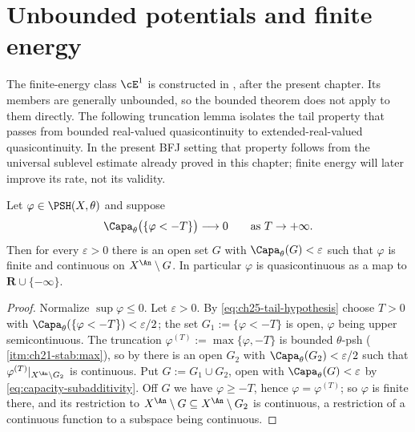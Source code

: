\section{Unbounded potentials and finite energy}
\label{sec:ch25-e1}

The finite-energy class $\cE^1$ is constructed in
, after the present chapter.  Its members are
generally unbounded, so the bounded theorem does not apply to them directly.
The following truncation lemma isolates the tail property that passes from
bounded real-valued quasicontinuity to extended-real-valued
quasicontinuity.  In the present BFJ setting that property follows from the
universal sublevel estimate already proved in this chapter; finite energy
will later improve its rate, not its validity.

\begin{lemma}
\label{lem:ch25-quasicontinuity-from-tail}
Let $\varphi\in\PSH(X,\theta)$ and suppose
\begin{equation}
\label{eq:ch25-tail-hypothesis}
 \Capa_\theta\bigl(\{\varphi<-T\}\bigr)\longrightarrow0
 \qquad\text{as }T\to+\infty .
\end{equation}
Then for every $\varepsilon>0$ there is an open set $G$ with
$\Capa_\theta(G)<\varepsilon$ such that $\varphi$ is finite and
continuous on $X^{\An}\setminus G$.  In particular $\varphi$ is
quasicontinuous as a map to $\mathbf R\cup\{-\infty\}$.
\end{lemma}

\begin{proof}
Normalize $\sup\varphi\leq0$.  Let $\varepsilon>0$.  By
\eqref{eq:ch25-tail-hypothesis} choose $T>0$ with
$\Capa_\theta(\{\varphi<-T\})<\varepsilon/2$; the set
$G_1:=\{\varphi<-T\}$ is open, $\varphi$ being upper semicontinuous.  The
truncation $\varphi^{(T)}:=\max\{\varphi,-T\}$ is bounded $\theta$-psh
(\,\cref{itm:ch21-stab:max}), so by
 there is an open $G_2$ with
$\Capa_\theta(G_2)<\varepsilon/2$ such that
$\varphi^{(T)}|_{X^{\An}\setminus G_2}$ is continuous.  Put
$G:=G_1\cup G_2$, open with $\Capa_\theta(G)<\varepsilon$ by
\eqref{eq:capacity-subadditivity}.  Off $G$ we have $\varphi\geq-T$,
hence $\varphi=\varphi^{(T)}$; so $\varphi$ is finite there, and its
restriction to $X^{\An}\setminus G\subseteq X^{\An}\setminus G_2$ is
continuous, a restriction of a continuous function to a subspace being
continuous.
\end{proof}

